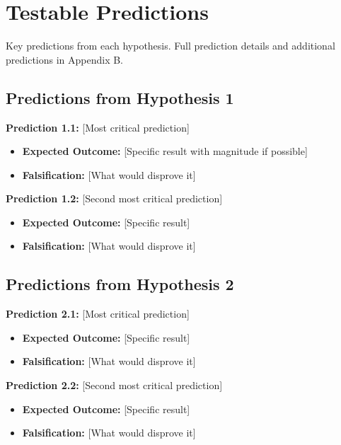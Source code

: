\documentclass[11pt,letterpaper]{article}
\begin{document}
\section{Testable Predictions}

Key predictions from each hypothesis. Full prediction details and additional predictions in Appendix B.

\subsection*{Predictions from Hypothesis 1}

\begin{predictionbox}

\textbf{Prediction 1.1:} [Most critical prediction]
\begin{itemize}
  \item \textbf{Expected Outcome:} [Specific result with magnitude if possible]
  \item \textbf{Falsification:} [What would disprove it]
\end{itemize}

\vspace{0.15cm}

\textbf{Prediction 1.2:} [Second most critical prediction]
\begin{itemize}
  \item \textbf{Expected Outcome:} [Specific result]
  \item \textbf{Falsification:} [What would disprove it]
\end{itemize}

\end{predictionbox}

\vspace{0.3cm}

\subsection*{Predictions from Hypothesis 2}

\begin{predictionbox}

\textbf{Prediction 2.1:} [Most critical prediction]
\begin{itemize}
  \item \textbf{Expected Outcome:} [Specific result]
  \item \textbf{Falsification:} [What would disprove it]
\end{itemize}

\vspace{0.15cm}

\textbf{Prediction 2.2:} [Second most critical prediction]
\begin{itemize}
  \item \textbf{Expected Outcome:} [Specific result]
  \item \textbf{Falsification:} [What would disprove it]
\end{itemize}

\end{predictionbox}
\end{document}
